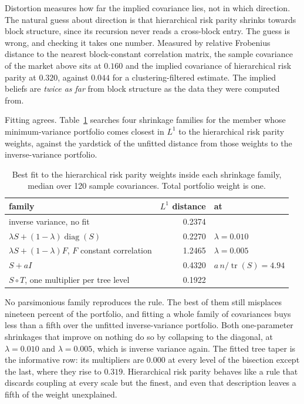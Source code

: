 \documentclass[11pt]{article}
\theoremstyle{remark}
\begin{document}
Distortion measures how far the implied covariance lies, not in which
direction. The natural guess about direction is that hierarchical risk
parity shrinks towards block structure, since its recursion never reads a
cross-block entry. The guess is wrong, and checking it takes one number.
Measured by relative Frobenius distance to the nearest block-constant
correlation matrix, the sample covariance of the market above sits at
$0.160$ and the implied covariance of hierarchical risk parity at $0.320$,
against $0.044$ for a clustering-filtered estimate. The implied beliefs are
\emph{twice as far} from block structure as the data they were computed
from.

Fitting agrees. Table~\ref{tab:fits} searches four shrinkage families for
the member whose minimum-variance portfolio comes closest in $L^1$ to the
hierarchical risk parity weights, against the yardstick of the unfitted
distance from those weights to the inverse-variance portfolio.

\begin{table}[ht]
\centering
\begin{tabular}{lrl}
\toprule
family & $L^1$ distance & at \\
\midrule
inverse variance, no fit & 0.2374 & \\
$\lambda S + (1-\lambda)\operatorname{diag}(S)$ & 0.2270 & $\lambda = 0.010$ \\
$\lambda S + (1-\lambda)F$, $F$ constant correlation & 1.2465 & $\lambda = 0.005$ \\
$S + a I$ & 0.4320 & $a\,n/\operatorname{tr}(S) = 4.94$ \\
$S \circ T$, one multiplier per tree level & 0.1922 & \\
\bottomrule
\end{tabular}
\caption{Best fit to the hierarchical risk parity weights inside each
shrinkage family, median over 120 sample covariances. Total portfolio weight
is one.}
\label{tab:fits}
\end{table}

No parsimonious family reproduces the rule. The best of them still misplaces nineteen
percent of the portfolio, and fitting a whole family of covariances buys
less than a fifth over the unfitted inverse-variance portfolio. Both
one-parameter shrinkages that improve on nothing do so by collapsing to the
diagonal, at $\lambda = 0.010$ and $\lambda = 0.005$, which is inverse
variance again. The fitted tree taper is the informative row: its
multipliers are $0.000$ at every level of the bisection except the last,
where they rise to $0.319$. Hierarchical risk parity behaves like a rule
that discards coupling at every scale but the finest, and even that
description leaves a fifth of the weight unexplained.
\end{document}

